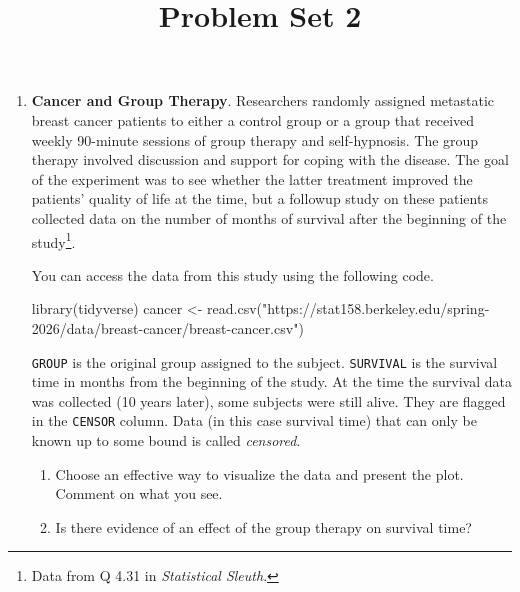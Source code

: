 \documentclass[
  letterpaper,
  DIV=11,
  numbers=noendperiod]{scrartcl}
\title{Problem Set 2}
\author{}
\date{}
\newenvironment{Shaded}{\begin{snugshade}}{\end{snugshade}}
\newcommand{\FunctionTok}[1]{\textcolor[rgb]{0.28,0.35,0.67}{#1}}
\newcommand{\NormalTok}[1]{\textcolor[rgb]{0.00,0.23,0.31}{#1}}
\newcommand{\OtherTok}[1]{\textcolor[rgb]{0.00,0.23,0.31}{#1}}
\newcommand{\StringTok}[1]{\textcolor[rgb]{0.13,0.47,0.30}{#1}}
\providecommand{\tightlist}{%
  \setlength{\itemsep}{0pt}\setlength{\parskip}{0pt}}
\begin{document}
\maketitle


\begin{enumerate}
\def\labelenumi{\arabic{enumi}.}
\item
  \textbf{Cancer and Group Therapy}. Researchers randomly assigned
  metastatic breast cancer patients to either a control group or a group
  that received weekly 90-minute sessions of group therapy and
  self-hypnosis. The group therapy involved discussion and support for
  coping with the disease. The goal of the experiment was to see whether
  the latter treatment improved the patients' quality of life at the
  time, but a followup study on these patients collected data on the
  number of months of survival after the beginning of the
  study\footnote{Data from Q 4.31 in \emph{Statistical Sleuth}.}.

  You can access the data from this study using the following code.

\begin{Shaded}
\begin{Highlighting}[]
\FunctionTok{library}\NormalTok{(tidyverse)}
\NormalTok{cancer }\OtherTok{\textless{}{-}} \FunctionTok{read.csv}\NormalTok{(}\StringTok{"https://stat158.berkeley.edu/spring{-}2026/data/breast{-}cancer/breast{-}cancer.csv"}\NormalTok{)}
\end{Highlighting}
\end{Shaded}

  \texttt{GROUP} is the original group assigned to the subject.
  \texttt{SURVIVAL} is the survival time in months from the beginning of
  the study. At the time the survival data was collected (10 years
  later), some subjects were still alive. They are flagged in the
  \texttt{CENSOR} column. Data (in this case survival time) that can
  only be known up to some bound is called \emph{censored}.

  \begin{enumerate}
  \def\labelenumii{\alph{enumii}.}
  \tightlist
  \item
    Choose an effective way to visualize the data and present the plot.
    Comment on what you see.
  \item
    Is there evidence of an effect of the group therapy on survival
    time?


\end{enumerate}
\end{enumerate}
\end{document}
